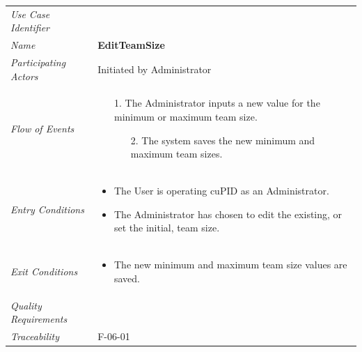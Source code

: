 \documentclass[12pt,letterpaper]{article}
\begin{document}
\begin{center}
	\begin{tabu} to 
		\toprule
		Use Case Identifier & \editteamsize{} \\
		Name & {\bf EditTeamSize} \\
		Participating Actors & Initiated by Administrator \\
		Flow of Events & 
		\begin{minipage}[t]{\linewidth}
		    \begin{enumerate}
			    \item[1.] The Administrator inputs a new value for the minimum or maximum team size.
			    \begin{enumerate}
			        \item[2.] The system saves the new minimum and maximum team sizes.
			    \end{enumerate}
			\end{enumerate}
		\end{minipage} \\

		Entry Conditions &
		\begin{minipage}[t]{\linewidth}
			\begin{itemize}
			    \item The User is operating cuPID as an Administrator.
			    \item The Administrator has chosen to edit the existing, or set the initial, team size.
	        \end{itemize}
		\end{minipage} \\

		Exit Conditions &
		\begin{minipage}[t]{\linewidth}
			\begin{itemize}
			    \item The new minimum and maximum team size values are saved.
	        \end{itemize}
		\end{minipage} \\

		Quality Requirements & \\

		Traceability & F-06-01 \\
		\toprule
	\end{tabu}
\end{center}
\end{document}
